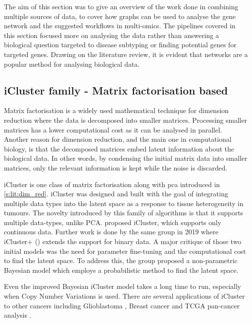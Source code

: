 The aim of this section was to give an overview of the work done in combining multiple sources of data, to cover how graphs can be used to analyse the gene network and the suggested workflows in multi-omics. The pipelines covered in this section focused more on analysing the data rather than answering a biological question targeted to disease subtyping or finding potential genes for targeted genes. Drawing on the literature review, it is evident that networks are a popular method for analysing biological data.

\subsection{iCluster family - Matrix factorisation based} \label{s:lit:iCluster}

Matrix factorisation is a widely used mathematical technique for dimension reduction where the data is decomposed into smaller matrices. Processing smaller matrices has a lower computational cost as it can be analysed in parallel. Another reason for dimension reduction, and the main one in computational biology, is that the decomposed matrices embed latent information about the biological data. In other words, by condensing the initial matrix data into smaller matrices, only the relevant information is kept while the noise is discarded. 

iCluster \citep{Shen2009-ew, Mo2013-zi, Mo2018-el} is one class of matrix factorisation along with \acrlong{pca} introduced in \cref{s:lit:dim_red}. iCluster was designed and built with the goal of integrating multiple data types into the latent space as a response to tissue heterogeneity in tumours. The novelty introduced by this family of algorithms is that it supports multiple data-types, unlike PCA. \citet{Shen2009-ew} proposed iCluster, which supports only continuous data. Further work is done by the same group in 2019  where iCluster+ (\citet{Mo2013-zi}) extends the support for binary data. A major critique of those two initial models was the need for parameter fine-tuning and the computational cost to find the latent space. To address this, the group proposed a non-parametric Bayesian model \citet{Mo2018-el} which employs a probabilistic method to find the latent space. 

Even the improved Bayesian iCluster model takes a long time to run, especially when Copy Number Variations is used. There are several applications of iCluster to other cancers including Glioblastoma \citep{Shen2012-yj},  Breast cancer \citep{Curtis2012-ff} and TCGA pan-cancer analysis \citep{Hoadley2018-qe}.

